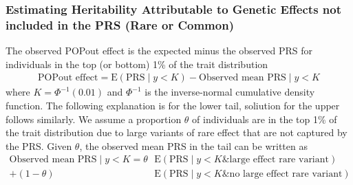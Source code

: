 \documentclass[12pt]{zHenriquesLab-StyleBioRxiv}
\newcommand{\E}{\mbox{E}}
\begin{document}
{{{\subsubsection*{Estimating Heritability Attributable to Genetic Effects not included in the PRS (Rare or Common)}
The observed POPout effect is the expected minus the observed PRS for
individuals in the top (or bottom) 1\% of the trait distribution
\begin{align}
  \mbox{POPout effect}  = \E(\mbox{PRS} \mid y<K)
  - \mbox{Observed mean PRS}  \mid y<K \label{popout}
\end{align}
where $K=\Phi^{-1}(0.01)$ and $\Phi^{-1}$ is the inverse-normal
cumulative density function. The following explanation is for the
lower tail, soliution for the upper follows similarly. We assume a
proportion $\theta$ of individuals are in the top 1\% of the trait
distribution due to large variants of rare effect that are not
captured by the PRS. Given $\theta$, the observed mean PRS in the tail
can be written as
\begin{align*}
  \mbox{Observed mean PRS} \mid y < K =
  \theta &\E( \mbox{PRS} \mid y<K \mbox{\& large
    effect rare variant})\\
    + (1-\theta) &\E( \mbox{PRS} \mid y<K  \mbox{\& no large
    effect rare variant})
\end{align*}

}}}
\end{document}
